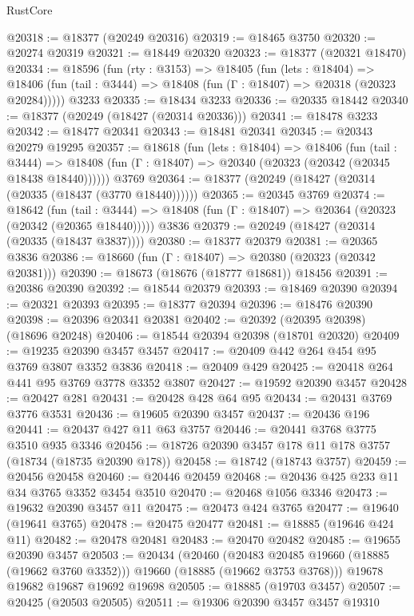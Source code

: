 \begin{lexlean}{RustCore}
\begin{coremodule}
@20318 := @18377 (@20249 @20316)
@20319 := @18465 @3750
@20320 := @20274 @20319
@20321 := @18449 @20320
@20323 := @18377 (@20321 @18470)
@20334 := @18596
    (fun (rty : @3153) =>
    @18405
      (fun (lets : @18404) =>
      @18406 (fun (tail : @3444) => @18408 (fun (Γ : @18407) => @20318 (@20323 @20284)))))
    @3233
@20335 := @18434 @3233
@20336 := @20335 @18442
@20340 := @18377 (@20249 (@18427 (@20314 @20336)))
@20341 := @18478 @3233
@20342 := @18477 @20341
@20343 := @18481 @20341
@20345 := @20343 @20279 @19295
@20357 := @18618
    (fun (lets : @18404) =>
    @18406
      (fun (tail : @3444) =>
      @18408 (fun (Γ : @18407) => @20340 (@20323 (@20342 (@20345 @18438 @18440))))))
    @3769
@20364 := @18377 (@20249 (@18427 (@20314 (@20335 (@18437 (@3770 @18440))))))
@20365 := @20345 @3769
@20374 := @18642
    (fun (tail : @3444) => @18408 (fun (Γ : @18407) => @20364 (@20323 (@20342 (@20365 @18440)))))
    @3836
@20379 := @20249 (@18427 (@20314 (@20335 (@18437 @3837))))
@20380 := @18377 @20379
@20381 := @20365 @3836
@20386 := @18660 (fun (Γ : @18407) => @20380 (@20323 (@20342 @20381)))
@20390 := @18673 (@18676 (@18777 @18681)) @18456
@20391 := @20386 @20390
@20392 := @18544 @20379
@20393 := @18469 @20390
@20394 := @20321 @20393
@20395 := @18377 @20394
@20396 := @18476 @20390
@20398 := @20396 @20341 @20381
@20402 := @20392 (@20395 @20398) (@18696 @20248)
@20406 := @18544 @20394 @20398 (@18701 @20320)
@20409 := @19235 @20390 @3457 @3457
@20417 := @20409 @442 @264 @454 @95 @3769 @3807 @3352 @3836
@20418 := @20409 @429
@20425 := @20418 @264 @441 @95 @3769 @3778 @3352 @3807
@20427 := @19592 @20390 @3457
@20428 := @20427 @281
@20431 := @20428 @428 @64 @95
@20434 := @20431 @3769 @3776 @3531
@20436 := @19605 @20390 @3457
@20437 := @20436 @196
@20441 := @20437 @427 @11 @63 @3757
@20446 := @20441 @3768 @3775 @3510 @935 @3346
@20456 := @18726 @20390 @3457 @178 @11 @178 @3757 (@18734 (@18735 @20390 @178))
@20458 := @18742 (@18743 @3757)
@20459 := @20456 @20458
@20460 := @20446 @20459
@20468 := @20436 @425 @233 @11 @34 @3765 @3352 @3454 @3510
@20470 := @20468 @1056 @3346
@20473 := @19632 @20390 @3457 @11
@20475 := @20473 @424 @3765
@20477 := @19640 (@19641 @3765)
@20478 := @20475 @20477
@20481 := @18885 (@19646 @424 @11)
@20482 := @20478 @20481
@20483 := @20470 @20482
@20485 := @19655 @20390 @3457
@20503 := @20434
    (@20460
      (@20483 @20485 @19660 (@18885 (@19662 @3760 @3352)))
      @19660
      (@18885 (@19662 @3753 @3768)))
    @19678
    @19682
    @19687
    @19692
    @19698
@20505 := @18885 (@19703 @3457)
@20507 := @20425 (@20503 @20505)
@20511 := @19306 @20390 @3457 @3457 @19310

\end{coremodule}
\end{lexlean}
